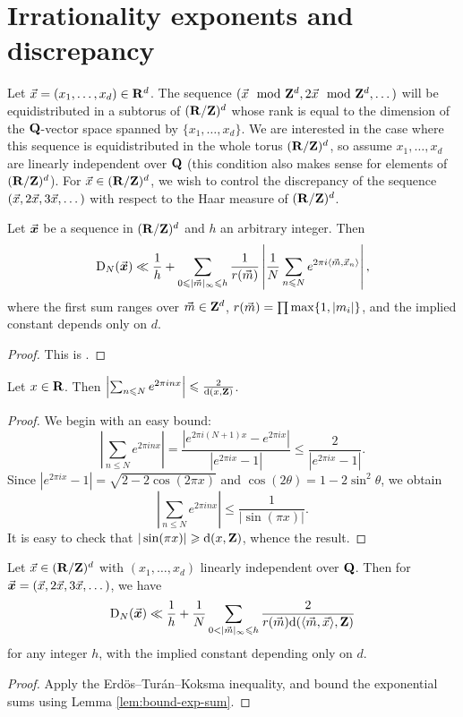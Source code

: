 \section{Irrationality exponents and discrepancy}

Let $\vec{x}=(x_1,\dots,x_d)\in \mathbf{R}^d$. The sequence 
$(\vec{x}\mod {\mathbf{Z}}^d,2\vec{x}\mod{\mathbf{Z}}^d,\dots)$ will be equidistributed in a subtorus of 
$(\mathbf{R}/\mathbf{Z})^d$ whose rank is equal to the dimension of the $\mathbf{Q}$-vector space 
spanned by $\{x_1,\dots,x_d\}$. We are interested in the case where this 
sequence is equidistributed in the whole torus $(\mathbf{R}/\mathbf{Z})^d$, so assume 
$x_1,\dots,x_d$ are linearly independent over $\mathbf{Q}$ (this condition also 
makes sense for elements of $(\mathbf{R}/\mathbf{Z})^d$). For $\vec{x}\in (\mathbf{R}/\mathbf{Z})^d$, we wish 
to control the discrepancy of the sequence $(\vec{x},2\vec{x},3\vec{x},\dots)$ with respect 
to the Haar measure of $(\mathbf{R}/\mathbf{Z})^d$. 

\begin{theorem}
Let $\vec{\boldsymbol x}$ be a sequence in $(\mathbf{R}/\mathbf{Z})^d$ and $h$ an arbitrary integer. Then 
\[
	\operatorname{D}_N(\vec{\boldsymbol x}) \ll \frac 1 h + \sum_{0\leqslant |\vec{m}|_\infty \leqslant h} \frac{1}{r(\vec{m})} \left| \frac 1 N \sum_{n\leqslant N} e^{2\pi i \langle \vec{m},\vec{x}_n\rangle}\right| ,
\]
where the first sum ranges over $\vec{m}\in \mathbf{Z}^d$, 
$r(\vec{m}) = \prod \max\{1,|m_i|\}$, and the implied constant depends only on $d$. 
\end{theorem}
\begin{proof}
This is \cite[Th.~1.21]{drmota-tichy-1997}. 
\end{proof}

\begin{lemma}\label{lem:bound-exp-sum}
Let $x\in \mathbf{R}$. Then 
$\left| \sum_{n\leqslant N} e^{2\pi i n x}\right| \leqslant \frac{2}{\mathrm{d}(x, \mathbf{Z})}$. 
\end{lemma}
\begin{proof}
We begin with an easy bound: 
\[
	\left| \sum_{n\leqslant N} e^{2\pi i n x}\right| = \frac{|e^{2\pi i (N+1) x} - e^{2\pi i x}|}{|e^{2\pi i x} - 1|} \leqslant \frac{2}{|e^{2\pi i x} - 1|} .
\]
Since $|e^{2\pi i x} - 1| = \sqrt{2-2\cos(2\pi x)}$ and 
$\cos(2\theta) = 1-2\sin^2\theta$, we obtain 
\[
	\left|\sum_{n\leqslant N} e^{2\pi i n x}\right| \leqslant \frac{1}{|\sin(\pi x)|} .
\]
It is easy to check that $|\sin(\pi x)| \geqslant \mathrm{d}(x,\mathbf{Z})$, whence the result.  
\end{proof}

\begin{corollary}\label{cor:bound-disc-distance}
Let $\vec{x}\in (\mathbf{R}/\mathbf{Z})^d$ with $(x_1,\dots,x_d)$ linearly independent over $\mathbf{Q}$. 
Then for $\vec{\boldsymbol x}=(\vec{x},2\vec{x},3\vec{x},\dots)$, we have 
\[
	\D_N(\bvx) \ll \frac 1 h + \frac 1 N \sum_{0<|\vm|_\infty \leqslant h} \frac{2}{r(\vm) \dd(\langle \vm,\vx\rangle,\bZ)} 
\]
for any integer $h$, with the implied constant depending only on $d$. 
\end{corollary}
\begin{proof}
Apply the Erd\"os--Tur\'an--Koksma inequality, and bound the exponential sums 
using Lemma \ref{lem:bound-exp-sum}. 
\end{proof}

